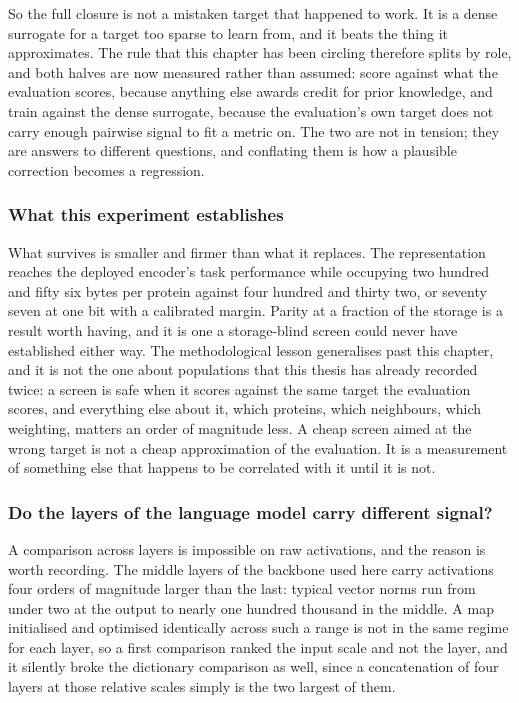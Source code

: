 So the full closure is not a mistaken target that happened to work. It is a dense
surrogate for a target too sparse to learn from, and it beats the thing it approximates.
The rule that this chapter has been circling therefore splits by role, and both halves are
now measured rather than assumed: score against what the evaluation scores, because
anything else awards credit for prior knowledge, and train against the dense surrogate,
because the evaluation's own target does not carry enough pairwise signal to fit a metric
on. The two are not in tension; they are answers to different questions, and conflating
them is how a plausible correction becomes a regression.

\subsubsection{What this experiment establishes}

What survives is smaller and firmer than what it replaces. The representation reaches the
deployed encoder's task performance while occupying two hundred and fifty six bytes per
protein against four hundred and thirty two, or seventy seven at one bit with a calibrated
margin. Parity at a fraction of the storage is a result worth having, and it is one a
storage-blind screen could never have established either way. The methodological lesson
generalises past this chapter, and it is not the one about populations that this thesis
has already recorded twice: a screen is safe when it scores against the same target the
evaluation scores, and everything else about it, which proteins, which neighbours, which
weighting, matters an order of magnitude less. A cheap screen aimed at the wrong target
is not a cheap approximation of the evaluation. It is a measurement of something else
that happens to be correlated with it until it is not.

\subsubsection{Do the layers of the language model carry different signal?}

A comparison across layers is impossible on raw activations, and the reason is worth
recording. The middle layers of the backbone used here carry activations four orders
of magnitude larger than the last: typical vector norms run from under two at the
output to nearly one hundred thousand in the middle. A map initialised and optimised
identically across such a range is not in the same regime for each layer, so a first
comparison ranked the input scale and not the layer, and it silently broke the
dictionary comparison as well, since a concatenation of four layers at those relative
scales simply is the two largest of them.

